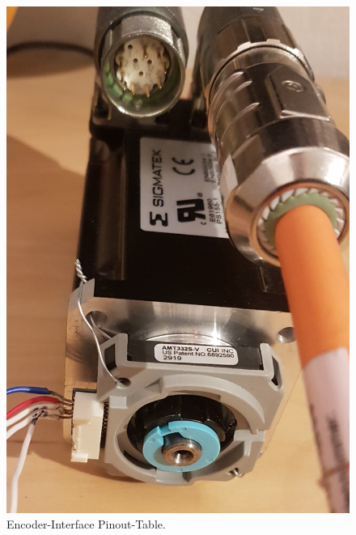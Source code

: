 \begin{appendix}
\begin{figure}[h!]
	\centering
	\includegraphics[angle = 270, width=\textwidth]{graphics/4_Encoder_Motor}
	\caption{Encoder-Interface Pinout-Table.}
	\label{fig:4_Encoder_Motor}
\end{figure}


\end{appendix}

